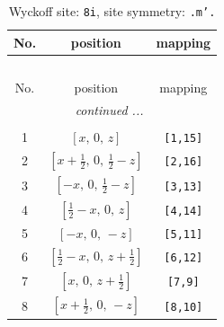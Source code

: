 \documentclass[fleqn,8pt]{jsarticle}
\begin{document}
\begin{longtable}{ccc}
\caption{Wyckoff site: {\tt 8i}, site symmetry: {\tt .m'.}}
 \\
 \hline \hline
No. & position & mapping \\ \hline \endfirsthead

\multicolumn{2}{l}{\tablename\ \thetable{}} \\
 \hline \hline
No. & position & mapping \\ \hline \endhead

 \hline \hline
\multicolumn{2}{r}{\footnotesize\it continued ...} \\ \endfoot

 \hline \hline
\multicolumn{2}{r}{} \\ \endlastfoot

1 & $\left[ x,\, 0,\, z \right]$ & {\tt [1,15]} \\ \hline
2 & $\left[ x + \frac{1}{2},\, 0,\, \frac{1}{2} - z \right]$ & {\tt [2,16]} \\ \hline
3 & $\left[ - x,\, 0,\, \frac{1}{2} - z \right]$ & {\tt [3,13]} \\ \hline
4 & $\left[ \frac{1}{2} - x,\, 0,\, z \right]$ & {\tt [4,14]} \\ \hline
5 & $\left[ - x,\, 0,\, - z \right]$ & {\tt [5,11]} \\ \hline
6 & $\left[ \frac{1}{2} - x,\, 0,\, z + \frac{1}{2} \right]$ & {\tt [6,12]} \\ \hline
7 & $\left[ x,\, 0,\, z + \frac{1}{2} \right]$ & {\tt [7,9]} \\ \hline
8 & $\left[ x + \frac{1}{2},\, 0,\, - z \right]$ & {\tt [8,10]} \\
\end{longtable}
\renewcommand{\arraystretch}{1.2}
\end{document}
